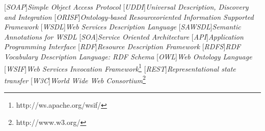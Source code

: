 
[\emph{SOAP}]{\emph{Simple Object Access Protocol}}
[\emph{UDDI}]{\emph{Universal Description, Discovery and Integration}}
[\emph{ORISF}]{\emph{Ontology-based Resourceoriented Information Supported Framework}}
[\emph{WSDL}]{\emph{Web Services Description Language}}
[\emph{SAWSDL}]{\emph{Semantic Annotations for WSDL}}
[\emph{SOA}]{\emph{Service Oriented Architecture}}
[\emph{API}]{\emph{Application Programming Interface}}
[\emph{RDF}]{\emph{Resource Description Framework}}
[\emph{RDFS}]{\emph{RDF Vocabulary Description Language: RDF Schema}}
[\emph{OWL}]{\emph{Web Ontology Language}}
[\emph{WSIF}]{\emph{Web Services Invocation Framework}\footnote{http://ws.apache.org/wsif/}}
[\emph{REST}]{\emph{Representational state transfer}}
[\emph{W3C}]{\emph{World Wide Web Consortium}\footnote{http://www.w3.org/}}
